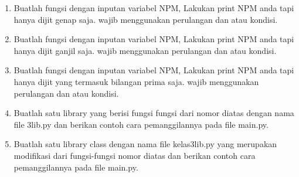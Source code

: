 \begin{enumerate}
    \item Buatlah fungsi dengan inputan variabel NPM, Lakukan print NPM anda tapi
    hanya dijit genap saja. wajib menggunakan perulangan dan atau kondisi.
    

    \item Buatlah fungsi dengan inputan variabel NPM, Lakukan print NPM anda tapi
    hanya dijit ganjil saja. wajib menggunakan perulangan dan atau kondisi.
    

    \item Buatlah fungsi dengan inputan variabel NPM, Lakukan print NPM anda tapi
    hanya dijit yang termasuk bilangan prima saja. wajib menggunakan perulangan
    dan atau kondisi.
    

    \item Buatlah satu library yang berisi fungsi fungsi dari nomor diatas dengan nama
    file 3lib.py dan berikan contoh cara pemanggilannya pada file main.py.
    

    \item Buatlah satu library class dengan nama file kelas3lib.py yang merupakan
    modifikasi dari fungsi-fungsi nomor diatas dan berikan contoh cara pemanggilannya
    pada file main.py.
    
	
\end{enumerate}
    
